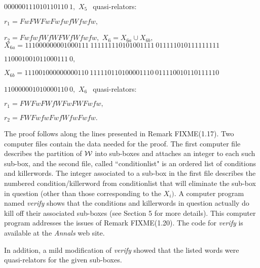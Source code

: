 \hfill  
$000000111010110110\ 1,$
\noindent $X_5\ \ $ quasi\/{\rm -}\/relators\/{\rm :}

$r_1 = FwFWFwFwfwfWfwfw,$

$r_2 = FwfwfWfWFWfWfwfw,$
\vfil
\noindent $X_6 = X_{6a} \cup X_{6b},$
\vfil
\noindent $X_{6a} = 
111000000001000111\ 
111111110101001111\ 
011111010111111111$\hfill

\hfill  
$110001001011000111\ 0,$

\noindent $X_{6b} = 
111001000000000110\ 
111110110100001110\ 
011110010110111110$\hfill

\hfill  
$110000001010000110\ 0,$
\noindent $X_6\ \ $ quasi\/{\rm -}\/relators\/{\rm :}\/

$r_1 = FWFwFWfWFwFWFwfw,$

$r_2 = FWFwfwFwfWfwFwfw.$
\endproclaim

 
The proof follows along the lines presented in Remark FIXME(1.17).  
Two computer files contain the data needed for the proof.   
The first computer file describes the partition of ${\cal W}$ into
sub-boxes and attaches an integer to each such sub-box, 
and the second file, called ``conditionlist" is an ordered list of conditions and killerwords.
The integer associated to a sub-box in the first file describes the numbered condition/killerword from   conditionlist that will eliminate the sub-box
in question (other than those corresponding to the $X_i).$ A computer program named {\it verify} shows
that the conditions and killerwords in question actually do kill off their associated sub-boxes (see Section 5 for more details).  This computer
program addresses the issues of Remark FIXME(1.20).  The code for {\it
verify} is available at the {\it Annals} web site. 

In addition, a mild modification of {\it verify} showed that the listed words were quasi-relators for the given sub-boxes. 
\enddemo


